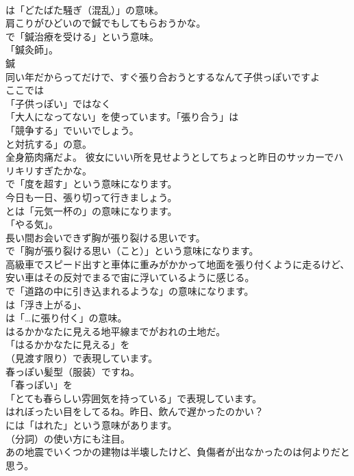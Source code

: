 \documentclass[8pt]{extreport}
\begin{document}
\begin{CJK}{UTF8}{min}
\\	は「どたばた騒ぎ（混乱）」の意味。	
\\	肩こりがひどいので鍼でもしてもらおうかな。 
\\	で「鍼治療を受ける」という意味。
\\	「鍼灸師」。	
\\	鍼
\\	同い年だからってだけで、すぐ張り合おうとするなんて子供っぽいですよ 
\\	ここでは
\\	「子供っぽい」ではなく
\\	「大人になってない」を使っています。「張り合う」は
\\	「競争する」でいいでしょう。
\\	と対抗する」の意。	
\\	全身筋肉痛だよ。 彼女にいい所を見せようとしてちょっと昨日のサッカーでハリキリすぎたかな。 
\\	で「度を超す」という意味になります。	
\\	今日も一日、張り切って行きましょう。 
\\	とは「元気一杯の」の意味になります。
\\	「やる気」。	
\\	長い間お会いできず胸が張り裂ける思いです。 
\\	で「胸が張り裂ける思い（こと）」という意味になります。	
\\	高級車でスピード出すと車体に重みがかかって地面を張り付くように走るけど、安い車はその反対でまるで宙に浮いているように感じる。 
\\	で「道路の中に引き込まれるような」の意味になります。
\\	は「浮き上がる」、
\\	は「…に張り付く」の意味。	
\\	はるかかなたに見える地平線までがおれの土地だ。 
\\	「はるかかなたに見える」を
\\	（見渡す限り）で表現しています。	
\\	春っぽい髪型（服装）ですね。 
\\	「春っぽい」を
\\	「とても春らしい雰囲気を持っている」で表現しています。	
\\	はれぼったい目をしてるね。昨日、飲んで遅かったのかい？ 
\\	には「はれた」という意味があります。
\\	（分詞）の使い方にも注目。	
\\	あの地震でいくつかの建物は半壊したけど、負傷者が出なかったのは何よりだと思う。 

\end{CJK}
\end{document}
